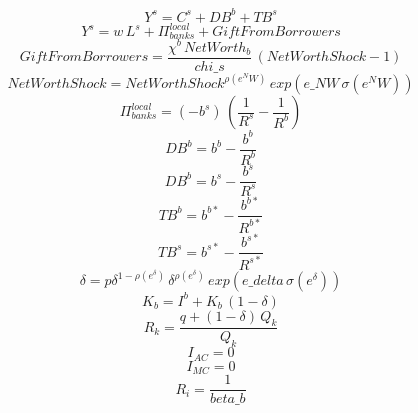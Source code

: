 \begin{dmath}
{Y^s}={C^s}+{DB^b}+{TB^s}
\end{dmath}
\begin{dmath}
{Y^s}={w}\, {L^s}+{\Pi^{local}_{banks}}+{ Gift From Borrowers }
\end{dmath}
\begin{dmath}
{ Gift From Borrowers }=\frac{{\chi^b }\, { NetWorth_b }}{{chi\_s}}\, \left({ Net Worth Shock }-1\right)
\end{dmath}
\begin{dmath}
{ Net Worth Shock }={ Net Worth Shock }^{{\rho(e^NW) }}\, exp\left({e\_NW}\, {\sigma(e^NW) }\right)
\end{dmath}
\begin{dmath}
{\Pi^{local}_{banks}}=\left(-{b^s}\right)\, \left(\frac{1}{{R^s}}-\frac{1}{{R^b}}\right)
\end{dmath}
\begin{dmath}
{DB^b}={b^b}-\frac{{b^b}}{{R^b}}
\end{dmath}
\begin{dmath}
{DB^b}={b^s}-\frac{{b^s}}{{R^s}}
\end{dmath}
\begin{dmath}
{TB^b}={b^{b*}}-\frac{{b^{b*}}}{{R^{b*}}}
\end{dmath}
\begin{dmath}
{TB^s}={b^{s*}}-\frac{{b^{s*}}}{{R^{s*}}}
\end{dmath}
\begin{dmath}
{\delta }={ p \delta }^{1-{ \rho(e^{\delta}) }}\, {\delta }^{{ \rho(e^{\delta}) }}\, exp\left({e\_delta}\, { \sigma(e^{\delta}) }\right)
\end{dmath}
\begin{dmath}
{K_b}={I^b}+{K_b}\, \left(1-{\delta }\right)
\end{dmath}
\begin{dmath}
{ R_k }=\frac{{q}+\left(1-{\delta }\right)\, { Q_k }}{{ Q_k }}
\end{dmath}
\begin{dmath}
{I_{AC}}=0
\end{dmath}
\begin{dmath}
{I_{MC}}=0
\end{dmath}
\begin{dmath}
{ R_i }=\frac{1}{{beta\_b}}
\end{dmath}
